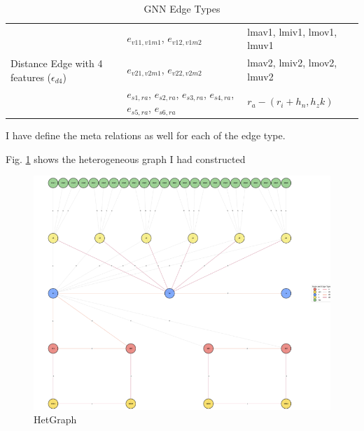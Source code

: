 \documentclass{report} %
\begin{document}
\begin{enumerate}
\begin{table}[H]
\begin{tabular}{|p{}|p{}|p{}|}
        \hline
        \multirow{3}{0.2\textwidth}{Distance Edge with 4 features (\( \epsilon_{d4} \))} & \( e_{v11, v1m1} \), \( e_{v12, v1m2} \) & lmav1, lmiv1, lmov1, lmuv1 \\
                                            &  \( e_{v21, v2m1} \), \( e_{v22, v2m2} \) & lmav2, lmiv2, lmov2, lmuv2 \\
                                            &  \( e_{s1, ra} \), \( e_{s2, ra} \), \( e_{s3, ra} \), \( e_{s4, ra} \), \( e_{s5, ra} \), \( e_{s6, ra} \)   &  \(r_a - (r_i + h_n, h_zk) \)\\

        \hline
        \end{tabular}
        \caption{\ac{GNN} Edge Types}
        \label{tab:GNN Edge Types}
    \end{table}

    I have define the meta relations as well for each of the edge type.

\end{enumerate}

Fig. \ref{fig:HetGraph} shows the heterogeneous graph I had constructed
\begin{figure}[H]
    \centering
    \includegraphics[width=1\textwidth]{./ReportImages/graph.png} 
    \caption{HetGraph}
    \label{fig:HetGraph}
\end{figure}

\listoffigures

\listoftables
\end{document}

